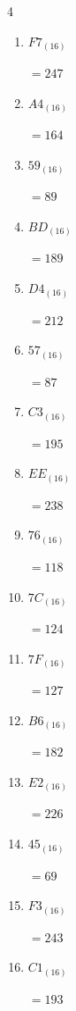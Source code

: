 \begin{multicols}{4}
\begin{enumerate}
        $=97$

  \item $F7_{(16)}$

        $=247$

  \item $A4_{(16)}$

        $=164$

\columnbreak %

  \item $59_{(16)}$

        $=89$

  \item $BD_{(16)}$

        $=189$

  \item $D4_{(16)}$

        $=212$

  \item $57_{(16)}$

        $=87$

  \item $C3_{(16)}$

        $=195$

  \item $EE_{(16)}$

        $=238$

  \item $76_{(16)}$

        $=118$

  \item $7C_{(16)}$

        $=124$

  \item $7F_{(16)}$

        $=127$

  \item $B6_{(16)}$

        $=182$

  \item $E2_{(16)}$

        $=226$

  \item $45_{(16)}$

        $=69$

  \item $F3_{(16)}$

        $=243$

  \item $C1_{(16)}$

        $=193$


\end{enumerate}
\end{multicols}
